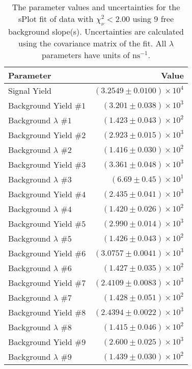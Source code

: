 
\begin{table}
    \begin{center}
        \begin{tabular}{lr}\toprule
            Parameter & Value \\\midrule
            Signal Yield & $(3.2549 \pm 0.0100) \times 10^{4}$ \\
            Background Yield $\#1$ & $(3.201 \pm 0.038) \times 10^{3}$ \\
            Background $\lambda$ $\#1$ & $(1.423 \pm 0.043) \times 10^{2}$ \\
            Background Yield $\#2$ & $(2.923 \pm 0.015) \times 10^{3}$ \\
            Background $\lambda$ $\#2$ & $(1.416 \pm 0.030) \times 10^{2}$ \\
            Background Yield $\#3$ & $(3.361 \pm 0.048) \times 10^{3}$ \\
            Background $\lambda$ $\#3$ & $(6.69 \pm 0.45) \times 10^{1}$ \\
            Background Yield $\#4$ & $(2.435 \pm 0.041) \times 10^{3}$ \\
            Background $\lambda$ $\#4$ & $(1.420 \pm 0.026) \times 10^{2}$ \\
            Background Yield $\#5$ & $(2.990 \pm 0.014) \times 10^{3}$ \\
            Background $\lambda$ $\#5$ & $(1.426 \pm 0.043) \times 10^{2}$ \\
            Background Yield $\#6$ & $(3.0757 \pm 0.0041) \times 10^{3}$ \\
            Background $\lambda$ $\#6$ & $(1.427 \pm 0.035) \times 10^{2}$ \\
            Background Yield $\#7$ & $(2.4109 \pm 0.0083) \times 10^{3}$ \\
            Background $\lambda$ $\#7$ & $(1.428 \pm 0.051) \times 10^{2}$ \\
            Background Yield $\#8$ & $(2.4394 \pm 0.0022) \times 10^{3}$ \\
            Background $\lambda$ $\#8$ & $(1.415 \pm 0.046) \times 10^{2}$ \\
            Background Yield $\#9$ & $(2.600 \pm 0.025) \times 10^{3}$ \\
            Background $\lambda$ $\#9$ & $(1.439 \pm 0.030) \times 10^{2}$ \\\bottomrule
        \end{tabular}
        \caption{The parameter values and uncertainties for the sPlot fit of data with $\chi^2_\nu < 2.00$ using 9 free background slope(s). Uncertainties are calculated using the covariance matrix of the fit. All $\lambda$ parameters have units of $\si{\nano\second}^{-1}$.}
    \end{center}
\end{table}
